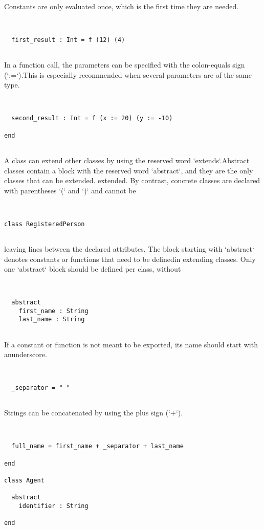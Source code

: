 \documentclass[12pt,a4paper]{article}
\begin{document}
Constants are only evaluated once, which is the first time they are needed. 


\begin{lstlisting}


  first_result : Int = f (12) (4)


\end{lstlisting}

In a function call, the parameters can be specified with the colon-equals sign (`:=`).This is especially recommended when several parameters are of the same type. 


\begin{lstlisting}


  second_result : Int = f (x := 20) (y := -10)

end


\end{lstlisting}

A class can extend other classes by using the reserved word `extends`.Abstract classes contain a block with the reserved word `abstract`, and they are the only
classes that can be extended.
extended. By contrast, concrete classes are declared with parentheses `(` and `)` and cannot be


\begin{lstlisting}


class RegisteredPerson


\end{lstlisting}

leaving lines between the declared attributes. The block starting with `abstract` denotes constants or functions that need to be definedin extending classes. Only one `abstract` block should be defined per class, without


\begin{lstlisting}


  abstract
    first_name : String
    last_name : String


\end{lstlisting}

If a constant or function is not meant to be exported, its name should start with anunderscore. 


\begin{lstlisting}


  _separator = " "


\end{lstlisting}

Strings can be concatenated by using the plus sign (`+`). 


\begin{lstlisting}


  full_name = first_name + _separator + last_name

end

class Agent

  abstract
    identifier : String

end


\end{lstlisting}
\end{document}
